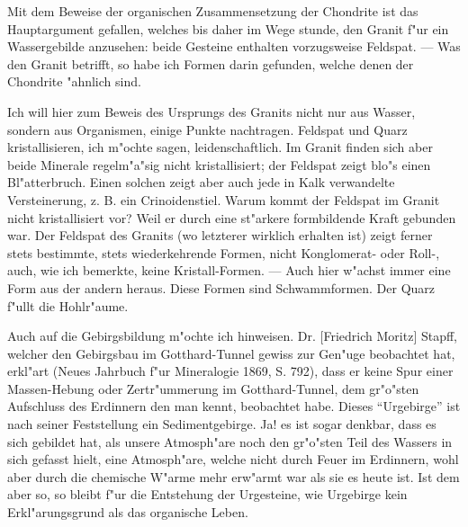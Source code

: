 \documentclass[a4paper, 11pt, oneside]{article}
\begin{document}
Mit dem Beweise der organischen Zusammensetzung der Chondrite ist das Hauptargument gefallen, welches bis daher im Wege stunde, den Granit f"ur ein Wassergebilde anzusehen: beide Gesteine enthalten vorzugsweise Feldspat. --- Was den Granit betrifft, so habe ich Formen darin gefunden, welche denen der Chondrite "ahnlich sind.

Ich will hier zum Beweis des Ursprungs des Granits nicht nur aus Wasser, sondern aus Organismen, einige Punkte nachtragen. Feldspat und Quarz kristallisieren, ich m"ochte sagen, leidenschaftlich. Im Granit finden sich aber beide Minerale regelm"a"sig nicht kristallisiert; der Feldspat zeigt blo"s einen Bl"atterbruch. Einen solchen zeigt aber auch jede in Kalk verwandelte Versteinerung, z. B. ein Crinoidenstiel. Warum kommt der Feldspat im Granit nicht kristallisiert vor? Weil er durch eine st"arkere formbildende Kraft gebunden war. Der Feldspat des Granits (wo letzterer wirklich erhalten ist) zeigt ferner stets bestimmte, stets wiederkehrende Formen, nicht Konglomerat- oder Roll-, auch, wie ich bemerkte, keine Kristall-Formen. --- Auch hier w"achst immer eine Form aus der andern heraus. Diese Formen sind Schwammformen. Der Quarz f"ullt die Hohlr"aume.

Auch auf die Gebirgsbildung m"ochte ich hinweisen. Dr. [Friedrich Moritz] Stapff, welcher den Gebirgsbau im Gotthard-Tunnel gewiss zur Gen"uge beobachtet hat, erkl"art (Neues Jahrbuch f"ur Mineralogie 1869, S. 792), dass er keine Spur einer Massen-Hebung oder Zertr"ummerung im Gotthard-Tunnel, dem gr"o"sten Aufschluss des Erdinnern den man kennt, beobachtet habe. Dieses "`Urgebirge"' ist nach seiner Feststellung ein Sedimentgebirge. Ja! es ist sogar denkbar, dass es sich gebildet hat, als unsere Atmosph"are noch den gr"o"sten Teil des Wassers in sich gefasst hielt, eine Atmosph"are, welche nicht durch Feuer im Erdinnern, wohl aber durch die chemische W"arme mehr erw"armt war als sie es heute ist. Ist dem aber so, so bleibt f"ur die Entstehung der Urgesteine, wie Urgebirge kein Erkl"arungsgrund als das organische Leben.
\end{document}
